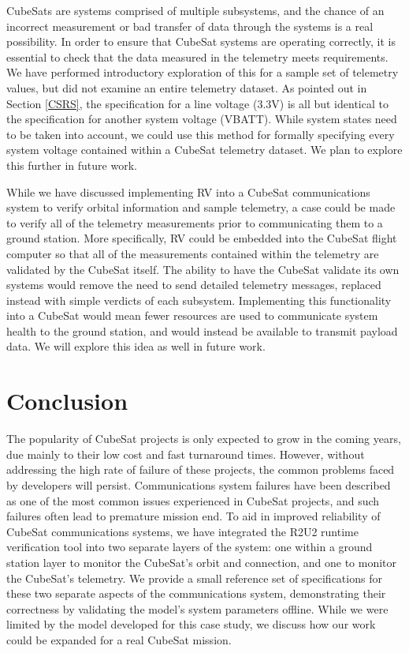 \documentclass[conf]{new-aiaa}
\begin{document}
CubeSats are systems comprised of multiple subsystems, and the chance of an incorrect measurement or bad transfer of data through the systems is a real possibility. In order to ensure that CubeSat systems are operating correctly, it is essential to check that the data measured in the telemetry meets requirements. We have performed introductory exploration of this for a sample set of telemetry values, but did not examine an entire telemetry dataset. As pointed out in Section \ref{CSRS}, the specification for a line voltage (3.3V) is all but identical to the specification for another system voltage (VBATT). While system states need to be taken into account,%
we could use this method for formally specifying every system voltage contained within a CubeSat telemetry dataset. We plan to explore this further in future work.

While we have discussed implementing RV into a CubeSat communications system to verify orbital information and sample telemetry, a case could be made to verify all of the telemetry measurements prior to communicating them to a ground station. More specifically, RV could be embedded into the CubeSat flight computer so that all of the measurements contained within the telemetry are validated by the CubeSat itself. The ability to have the CubeSat validate its own systems would remove the need to send detailed telemetry messages, replaced instead with simple verdicts of each subsystem. Implementing this functionality into a CubeSat would mean fewer resources are used to communicate system health to the ground station, and would instead be available to transmit payload data. We will explore this idea as well in future work.


\section{Conclusion}  \label{Conclusion}

The popularity of CubeSat projects is only expected to grow in the coming years, due mainly to their low cost and fast turnaround times. However, without addressing the high rate of failure of these projects, the common problems faced by developers will persist. Communications system failures have been described as one of the most common issues experienced in CubeSat projects, and such failures often lead to premature mission end. To aid in improved reliability of CubeSat communications systems, we have integrated the R2U2 runtime verification tool into two separate layers of the system: one within a ground station layer to monitor the CubeSat's orbit and connection, and one to monitor the CubeSat's telemetry. We provide a small reference set of specifications for these two separate aspects of the communications system, demonstrating their correctness by validating the model's system parameters offline. While we were limited by the model developed for this case study, we discuss how our work could be expanded for a real CubeSat mission.
\end{document}
